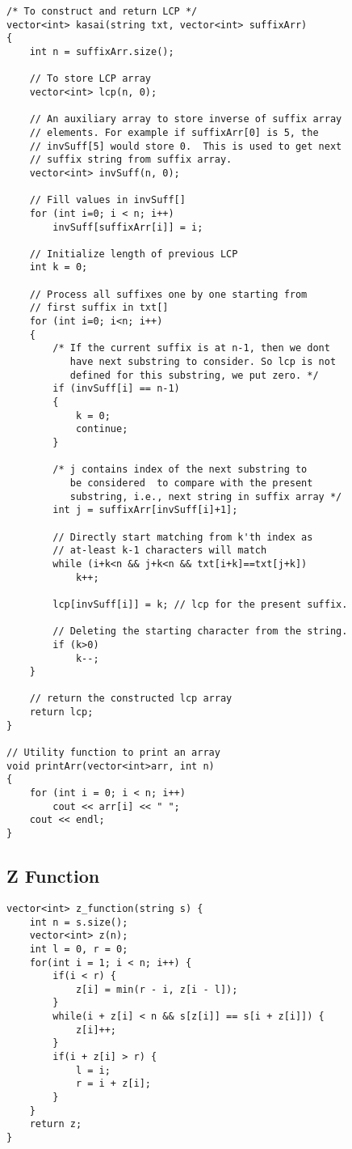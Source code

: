 \documentclass[10pt]{article}
\begin{document}
\begin{multicols*}{2}
\begin{lstlisting}[style=compactcpp]
/* To construct and return LCP */
vector<int> kasai(string txt, vector<int> suffixArr)
{
    int n = suffixArr.size();
 
    // To store LCP array
    vector<int> lcp(n, 0);
 
    // An auxiliary array to store inverse of suffix array
    // elements. For example if suffixArr[0] is 5, the
    // invSuff[5] would store 0.  This is used to get next
    // suffix string from suffix array.
    vector<int> invSuff(n, 0);
 
    // Fill values in invSuff[]
    for (int i=0; i < n; i++)
        invSuff[suffixArr[i]] = i;
 
    // Initialize length of previous LCP
    int k = 0;
 
    // Process all suffixes one by one starting from
    // first suffix in txt[]
    for (int i=0; i<n; i++)
    {
        /* If the current suffix is at n-1, then we dont
           have next substring to consider. So lcp is not
           defined for this substring, we put zero. */
        if (invSuff[i] == n-1)
        {
            k = 0;
            continue;
        }
 
        /* j contains index of the next substring to
           be considered  to compare with the present
           substring, i.e., next string in suffix array */
        int j = suffixArr[invSuff[i]+1];
 
        // Directly start matching from k'th index as
        // at-least k-1 characters will match
        while (i+k<n && j+k<n && txt[i+k]==txt[j+k])
            k++;
 
        lcp[invSuff[i]] = k; // lcp for the present suffix.
 
        // Deleting the starting character from the string.
        if (k>0)
            k--;
    }
 
    // return the constructed lcp array
    return lcp;
}
 
// Utility function to print an array
void printArr(vector<int>arr, int n)
{
    for (int i = 0; i < n; i++)
        cout << arr[i] << " ";
    cout << endl;
}
\end{lstlisting}

\subsection{Z Function}

\begin{lstlisting}[style=compactcpp]
vector<int> z_function(string s) {
    int n = s.size();
    vector<int> z(n);
    int l = 0, r = 0;
    for(int i = 1; i < n; i++) {
        if(i < r) {
            z[i] = min(r - i, z[i - l]);
        }
        while(i + z[i] < n && s[z[i]] == s[i + z[i]]) {
            z[i]++;
        }
        if(i + z[i] > r) {
            l = i;
            r = i + z[i];
        }
    }
    return z;
}
\end{lstlisting}


\end{multicols*}
\end{document}
